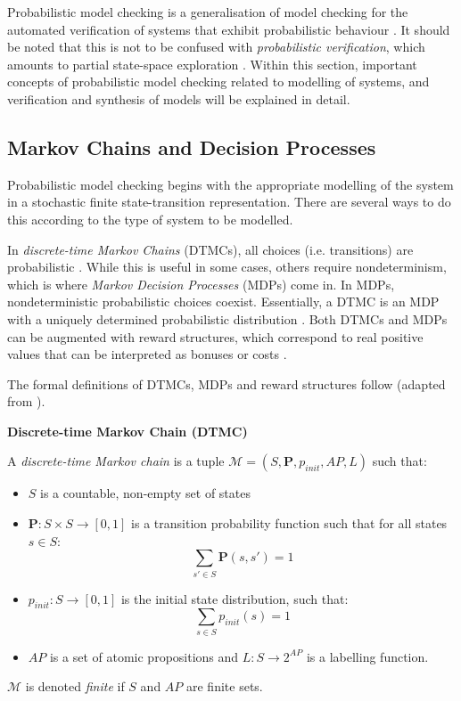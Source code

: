 Probabilistic model checking is a generalisation of model checking for the automated verification of systems that exhibit probabilistic behaviour \cite{fknp11, bk08}. It should be noted that this is not to be confused with \textit{probabilistic verification}, which amounts to partial state-space exploration \cite{bk08}. Within this section, important concepts of probabilistic model checking related to modelling of systems, and verification and synthesis of models will be explained in detail.

\subsection{Markov Chains and Decision Processes}
\label{sec:dtmcs_mdps}

Probabilistic model checking begins with the appropriate modelling of the system in a stochastic finite state-transition representation. There are several ways to do this according to the type of system to be modelled. 

In \textit{discrete-time Markov Chains} (DTMCs), all choices (i.e. transitions) are probabilistic \cite{bk08}. While this is useful in some cases, others require nondeterminism, which is where \textit{Markov Decision Processes} (MDPs) come in. In MDPs, nondeterministic probabilistic choices coexist. Essentially, a DTMC is an MDP with a uniquely determined probabilistic distribution \cite{bk08}. Both DTMCs and MDPs can be augmented with reward structures, which correspond to real positive values that can be interpreted as bonuses or costs \cite{bk08}.

The formal definitions of DTMCs, MDPs and reward structures follow (adapted from \cite{bk08, fknp11, kp07}).

{\begin{defi}
{\setlength{\parskip}{2em}
\textbf{Discrete-time Markov Chain (DTMC)}\vspace{1em}\\}
{\setlength{\parskip}{1em} 

A \textit{discrete-time Markov chain} is a tuple $\mathcal{M} = (S, \mathbf{P}, p_{init}, AP, L)$ such that:
\begin{itemize}
	\item $S$ is a countable, non-empty set of states
	\item $\mathbf{P}: S \times S \to [0,1]$ is a transition probability function such that for all states $s \in S$:
		\begin{equation}
			\sum_{s' \in S} \mathbf{P}(s,s') = 1
		\end{equation}
	\item $p_{init}: S \to [0,1]$ is the initial state distribution, such that:
		\begin{equation}
			\sum_{s \in S} p_{init}(s) = 1
		\end{equation}
	\item $AP$ is a set of atomic propositions and $L: S \to 2^{AP}$ is a labelling function. 
\end{itemize}

$\mathcal{M}$ is denoted \textit{finite} if $S$ and $AP$ are finite sets.
}
\end{defi}}

